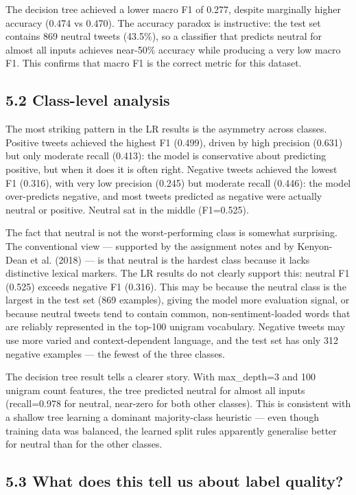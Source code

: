 \documentclass[
  12pt,
]{article}
\begin{document}
The decision tree achieved a lower macro F1 of 0.277, despite marginally
higher accuracy (0.474 vs 0.470). The accuracy paradox is instructive:
the test set contains 869 neutral tweets (43.5\%), so a classifier that
predicts neutral for almost all inputs achieves near-50\% accuracy while
producing a very low macro F1. This confirms that macro F1 is the
correct metric for this dataset.

\subsection{5.2 Class-level analysis}\label{class-level-analysis}

The most striking pattern in the LR results is the asymmetry across
classes. Positive tweets achieved the highest F1 (0.499), driven by high
precision (0.631) but only moderate recall (0.413): the model is
conservative about predicting positive, but when it does it is often
right. Negative tweets achieved the lowest F1 (0.316), with very low
precision (0.245) but moderate recall (0.446): the model over-predicts
negative, and most tweets predicted as negative were actually neutral or
positive. Neutral sat in the middle (F1=0.525).

The fact that neutral is not the worst-performing class is somewhat
surprising. The conventional view --- supported by the assignment notes
and by Kenyon-Dean et al. (2018) --- is that neutral is the hardest
class because it lacks distinctive lexical markers. The LR results do
not clearly support this: neutral F1 (0.525) exceeds negative F1
(0.316). This may be because the neutral class is the largest in the
test set (869 examples), giving the model more evaluation signal, or
because neutral tweets tend to contain common, non-sentiment-loaded
words that are reliably represented in the top-100 unigram vocabulary.
Negative tweets may use more varied and context-dependent language, and
the test set has only 312 negative examples --- the fewest of the three
classes.

The decision tree result tells a clearer story. With max\_depth=3 and
100 unigram count features, the tree predicted neutral for almost all
inputs (recall=0.978 for neutral, near-zero for both other classes).
This is consistent with a shallow tree learning a dominant
majority-class heuristic --- even though training data was balanced, the
learned split rules apparently generalise better for neutral than for
the other classes.

\subsection{5.3 What does this tell us about label
quality?}\label{what-does-this-tell-us-about-label-quality}
\end{document}
